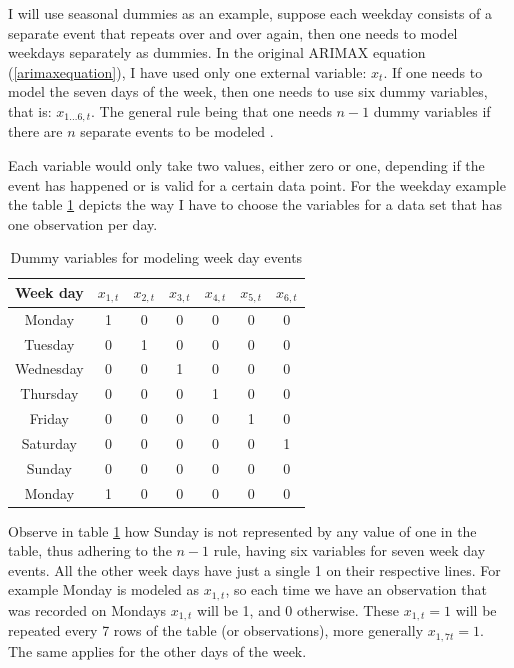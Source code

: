 \documentclass[12pt,a4paper,titlepage]{report}
\begin{document}
I will use seasonal dummies as an example, suppose each weekday consists of a separate event that repeats over and over again, then one needs to model weekdays separately as dummies. In the original ARIMAX equation (\ref{arimaxequation}), I have used only one external variable: $ x_{t} $. If one needs to model the seven days of the week, then one needs to use six dummy variables, that is: $ x_{1\dots6,t} $. The general rule being that one needs $ n - 1 $ dummy variables if there are $ n $ separate events to be modeled \cite{fpp2usefulpredictors}.

Each variable would only take two values, either zero or one, depending if the event has happened or is valid for a certain data point. For the weekday example the table \ref{weekdaydummies} depicts the way I have to choose the variables for a data set that has one observation per day.

\begin{table}[h]
    \begin{tabular}{|c|c|c|c|c|c|c|}
        \hline 
        \textbf{Week day} & \textbf{$x_{1,t}$} & \textbf{$x_{2,t}$} & \textbf{$x_{3,t}$} & \textbf{$x_{4,t}$} & \textbf{$x_{5,t}$} & \textbf{$x_{6,t}$} \\ \hline 
        Monday & 1 & 0 & 0 & 0 & 0 & 0 \\ \hline 
        Tuesday & 0 & 1 & 0 & 0 & 0 & 0 \\ \hline 
        Wednesday &	0 & 0 & 1 & 0 & 0 & 0 \\ \hline 
        Thursday & 0 & 0 & 0 & 1 & 0 & 0 \\ \hline 
        Friday & 0 & 0 & 0 & 0 & 1 & 0 \\ \hline 
        Saturday & 0 & 0 & 0 & 0 & 0 & 1 \\ \hline 
        Sunday & 0 & 0 & 0 & 0 & 0 & 0 \\ \hline 
        Monday & 1 & 0 & 0 & 0 & 0 & 0 \\ \hline 
    \end{tabular} 
    \centering
    \caption{Dummy variables for modeling week day events}
    \label{weekdaydummies}
\end{table}

Observe in table \ref{weekdaydummies} how Sunday is not represented by any value of one in the table, thus adhering to the $ n - 1 $ rule, having six variables for seven week day events. All the other week days have just a single 1 on their respective lines. For example Monday is modeled as $ x_{1,t} $, so each time we have an observation that was recorded on Mondays $ x_{1,t} $ will be 1, and 0 otherwise. These $ x_{1,t} = 1 $ will be repeated every 7 rows of the table (or observations), more generally $ x_{1,7t} = 1 $. The same applies for the other days of the week.
\end{document}
